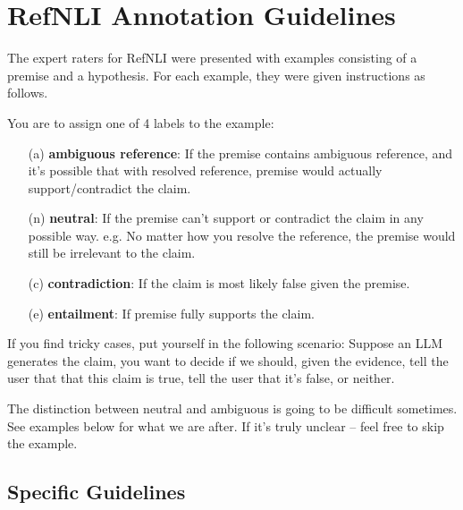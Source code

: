 \section{RefNLI Annotation Guidelines}
\label{appendix:rater-guidelines}

The expert raters for RefNLI were presented with examples consisting of a premise and a hypothesis. For each example, they were given  instructions as follows.

You are to assign one of 4 labels to the example:

\begin{enumerate}
    \item[(a)] \textbf{ambiguous reference}: If the premise contains ambiguous reference, and it’s possible that with resolved reference, premise would actually support/contradict the claim. 
    \item[(n)] \textbf{neutral}: If the premise can’t support or contradict the claim in any possible way. e.g. No matter how you resolve the reference, the premise would still be irrelevant to the claim.
    \item[(c)] \textbf{contradiction}: If the claim is most likely false given the premise.
    \item[(e)] \textbf{entailment}: If premise fully supports the claim.
\end{enumerate}

If you find tricky cases, put yourself in the following scenario: Suppose an LLM generates the claim, you want to decide if we should, given the evidence, tell the user that that this claim is true, tell the user that it's false, or neither. 

The distinction between neutral and ambiguous is going to be difficult sometimes. See examples below for what we are after. If it’s truly unclear – feel free to skip the example.

\subsection*{Specific Guidelines}

